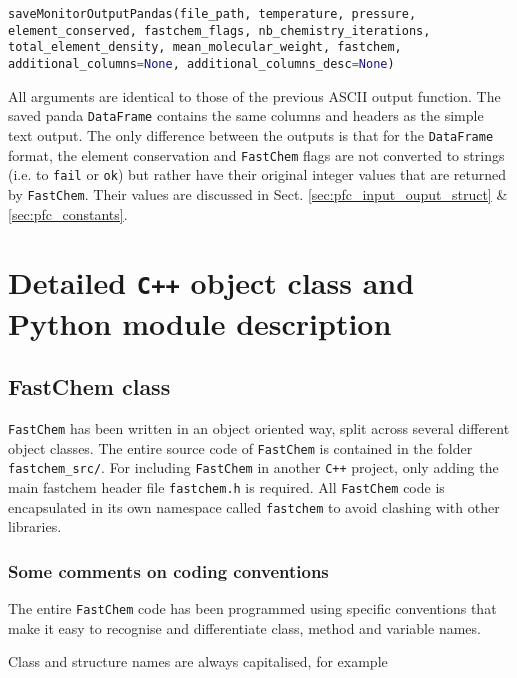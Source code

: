 \documentclass[numbers=noenddot]{aux/fcmanual}
\newcommand{\fc}{\texttt{FastChem}\xspace}
\newcommand{\cpp}{\ttt{C++}\xspace}
\newcommand{\ttt}[1]{\texttt {#1}}
\begin{document}
\bigbreak

\lstinline[language=Python, breaklines, breakatwhitespace]!saveMonitorOutputPandas(file_path, temperature, pressure, element_conserved, fastchem_flags, nb_chemistry_iterations, total_element_density, mean_molecular_weight, fastchem, additional_columns=None, additional_columns_desc=None)!

\bigbreak

All arguments are identical to those of the previous ASCII output function. The saved panda \lstinline[language=Python]!DataFrame! contains the same columns and headers as the simple text output. The only difference between the outputs is that for the \lstinline[language=Python]!DataFrame! format, the element conservation and \fc flags are not converted to strings (i.e. to \texttt{fail} or \texttt{ok}) but rather have their original integer values that are returned by \fc. Their values are discussed in Sect. \ref{sec:pfc_input_ouput_struct}  \& \ref{sec:pfc_constants}.




\part{Detailed \texttt{C++} object class and Python module description}
\label{part:code_details}


\chapter{FastChem class}
\label{sec:fc_class}

\fc has been written in an object oriented way, split across several different object classes. The entire source code of \fc is contained in the folder \verb|fastchem_src/|. For including \fc in another \cpp project, only adding the main fastchem header file \verb|fastchem.h| is required. All \fc code is encapsulated in its own namespace called \lstinline!fastchem! to avoid clashing with other libraries.


\section{Some comments on coding conventions}

The entire \fc code has been programmed using specific conventions that make it easy to recognise and differentiate class, method and variable names.

Class and structure names are always capitalised, for example
\end{document}
